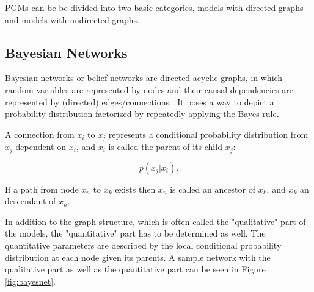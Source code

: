 PGMs can be be divided into two basic categories, models with directed graphs and models with undirected graphs.


\subsection{Bayesian Networks} \label{c:bayesnet}

Bayesian networks or belief networks are directed acyclic graphs, in which random variables are represented by nodes and their causal dependencies are represented by (directed) edges/connections \cite{Faltin2007} \cite{Goodfellow-et-al-2016-Book}. 
It poses a way to depict a probability distribution factorized by repeatedly applying the Bayes rule.

A connection from $x_i$ to $x_j$ represents a conditional probability distribution from $x_j$ dependent on $x_i$, and $x_i$ is called the parent of its child $x_j$:

\[
p(x_j | x_i) .
\]


If a path from node $x_n$ to $x_k$ exists then $x_n$ is called an ancestor of $x_k$, and $x_k$ an descendant of $x_n$. 

In addition to the graph structure, which is often called the "qualitative" part of the models, the "quantitative" part has to be determined as well.
The quantitative parameters are described by the local conditional probability distribution at each node given its parents.
A sample network with the qualitative part as well as the quantitative part can be seen in Figure \ref{fig:bayesnet}. 


